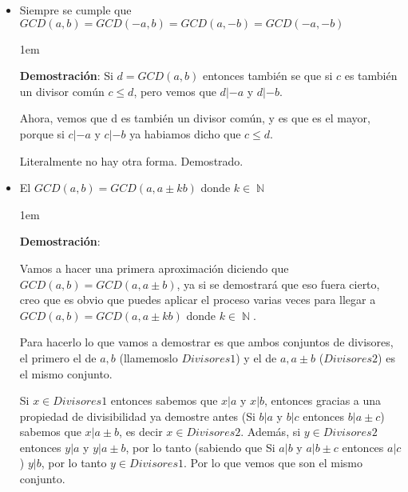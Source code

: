 \documentclass[12pt, fleqn]{report}                             %
\newenvironment{SmallIndentation}[1][0.75em]                    %
    {\begin{adjustwidth}{#1}{}\begin{footnotesize}}                 %
    {\end{footnotesize}\end{adjustwidth}}                           %
\DeclareMathOperator \Naturals  {\mathbb{N}}                     %
\begin{document}
\begin{itemize}
\begin{SmallIndentation}[1em]
                    \end{SmallIndentation} 


                \clearpage

                \item Siempre se cumple que $GCD(a,b) = GCD(-a,b) = GCD(a,-b) = GCD(-a,-b)$

                    \begin{SmallIndentation}[1em]
                        \textbf{Demostración}:
                        Si $d= GCD(a,b)$ entonces también se que si $c$ es también un divisor común
                        $c\leq d$, pero vemos que $d|-a$ y $d|-b$.

                        Ahora, vemos que d es también un divisor común, y es que es el mayor, porque
                        si $c|-a$ y $c|-b$ ya habiamos dicho que $c\leq d$.

                        Literalmente no hay otra forma. Demostrado.

                    \end{SmallIndentation} 


                \item El $GCD(a,b) = GCD(a, a \pm kb)$ donde $k \in \Naturals$

                    \begin{SmallIndentation}[1em]
                        \textbf{Demostración}:
                        
                        Vamos a hacer una primera aproximación diciendo que $GCD(a,b)=GCD(a, a \pm b)$, ya 
                        si se demostrará que eso fuera cierto, creo que es obvio que puedes aplicar el 
                        proceso varias veces para llegar a $GCD(a,b) = GCD(a, a \pm kb)$ donde
                        $k \in \Naturals$.

                        Para hacerlo lo que vamos a demostrar es que ambos conjuntos de divisores, el
                        primero el de $a,b$ (llamemoslo $Divisores1$) y el de $a, a \pm b$ ($Divisores2$)
                        es el mismo conjunto.

                        Si $x \in Divisores1$ entonces sabemos que $x|a$ y $x|b$, entonces gracias a una
                        propiedad de divisibilidad ya demostre antes (Si $b|a$ y $b|c$ entonces $b|a\pm c$)
                        sabemos que $x|a \pm b$, es decir $x \in Divisores2$. Además, si $y \in Divisores2$
                        entonces $y|a$ y $y|a \pm b$, por lo tanto (sabiendo que Si $a|b$ y $a|b \pm c$
                        entonces $a|c$) $y|b$, por lo tanto $y \in Divisores1$. Por lo que vemos que son el
                        mismo conjunto.


\end{SmallIndentation}
\end{itemize}
\end{document}
